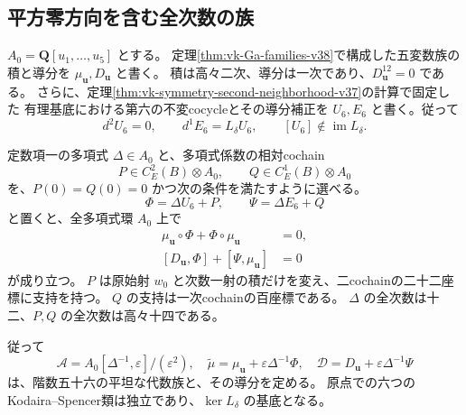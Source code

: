 \subsection{平方零方向を含む全次数の族}

$A_0=\mathbf Q[u_1,\ldots,u_5]$ とする。
定理\ref{thm:vk-Ga-families-v38}で構成した五変数族の積と導分を
$\mu_{\boldsymbol u},D_{\boldsymbol u}$ と書く。
積は高々二次、導分は一次であり、$D_{\boldsymbol u}^{12}=0$ である。
さらに、定理\ref{thm:vk-symmetry-second-neighborhood-v37}の計算で固定した
有理基底における第六の不変cocycleとその導分補正を
$U_6,E_6$ と書く。従って
\[
 d^2U_6=0,\qquad d^1E_6=L_\delta U_6,
 \qquad [U_6]\notin\operatorname{im}L_\delta.
\]

\begin{lemma}[有理係数による平方零横断族]
\label{lem:vk-rational-double-family-v39}
定数項一の多項式 $\Delta\in A_0$ と、多項式係数の相対cochain
\[
 P\in C_E^2(B)\otimes A_0,
 \qquad Q\in C_E^1(B)\otimes A_0
\]
を、$P(0)=Q(0)=0$ かつ次の条件を満たすように選べる。
\[
 \Phi=\Delta U_6+P,\qquad
 \Psi=\Delta E_6+Q
\]
と置くと、全多項式環 $A_0$ 上で
\begin{align}
 \mu_{\boldsymbol u}\circ\Phi+\Phi\circ\mu_{\boldsymbol u}&=0,
 \label{eq:double-associativity-identity-v39}\\
 [D_{\boldsymbol u},\Phi]+[\Psi,\mu_{\boldsymbol u}]&=0
 \label{eq:double-derivation-identity-v39}
\end{align}
が成り立つ。
$P$ は原始射 $w_0$ と次数一射の積だけを変え、二cochainの二十二座標に支持を持つ。
$Q$ の支持は一次cochainの百座標である。
$\Delta$ の全次数は十二、$P,Q$ の全次数は高々十四である。

従って
\begin{equation}
 \mathcal A=A_0[\Delta^{-1},\varepsilon]/(\varepsilon^2),
 \quad
 \widetilde\mu=\mu_{\boldsymbol u}+\varepsilon\Delta^{-1}\Phi,
 \quad
 \mathcal D=D_{\boldsymbol u}+\varepsilon\Delta^{-1}\Psi
 \label{eq:vk-rational-double-family-v39}
\end{equation}
は、階数五十六の平坦な代数族と、その導分を定める。
原点での六つのKodaira--Spencer類は独立であり、$\ker L_\delta$ の基底となる。
\end{lemma}

